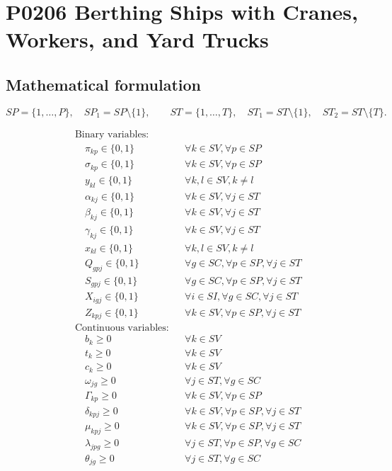 \documentclass[10pt]{article}
\begin{document}
\section*{P0206 Berthing Ships with Cranes, Workers, and Yard Trucks}
\subsection*{Mathematical formulation}
\[
SP=\{1,\ldots,P\},\quad SP_1=SP\setminus\{1\},\qquad
ST=\{1,\ldots,T\},\quad ST_1=ST\setminus\{1\},\quad ST_2=ST\setminus\{T\}.
\]

\begin{align*}
& \text{Binary variables:} \\
& \quad \pi_{kp} \in \{0, 1\} && \forall k \in SV, \forall p \in SP \\
& \quad \sigma_{kp} \in \{0, 1\} && \forall k \in SV, \forall p \in SP \\
& \quad y_{kl} \in \{0, 1\} && \forall k, l \in SV, k \neq l \\
& \quad \alpha_{kj} \in \{0, 1\} && \forall k \in SV, \forall j \in ST \\
& \quad \beta_{kj} \in \{0, 1\} && \forall k \in SV, \forall j \in ST \\
& \quad \gamma_{kj} \in \{0, 1\} && \forall k \in SV, \forall j \in ST \\
& \quad x_{kl} \in \{0, 1\} && \forall k, l \in SV, k \neq l \\
& \quad Q_{gpj} \in \{0, 1\} && \forall g \in SC, \forall p \in SP, \forall j \in ST \\
& \quad S_{gpj} \in \{0, 1\} && \forall g \in SC, \forall p \in SP, \forall j \in ST \\
& \quad X_{igj} \in \{0, 1\} && \forall i \in SI, \forall g \in SC, \forall j \in ST \\
& \quad Z_{kpj} \in \{0, 1\} && \forall k \in SV, \forall p \in SP, \forall j \in ST \\
& \text{Continuous variables:} \\
& \quad b_k \ge 0 && \forall k \in SV \\
& \quad t_k \ge 0 && \forall k \in SV \\
& \quad c_k \ge 0 && \forall k \in SV \\
& \quad \omega_{jg} \ge 0 && \forall j \in ST, \forall g \in SC \\
& \quad \Gamma_{kp} \ge 0 && \forall k \in SV, \forall p \in SP \\
& \quad \delta_{kpj} \ge 0 && \forall k \in SV, \forall p \in SP, \forall j \in ST \\
& \quad \mu_{kpj} \ge 0 && \forall k \in SV, \forall p \in SP, \forall j \in ST \\
& \quad \lambda_{jpg} \ge 0 && \forall j \in ST, \forall p \in SP, \forall g \in SC \\
& \quad \theta_{jg} \ge 0 && \forall j \in ST, \forall g \in SC
\end{align*}
\end{document}
